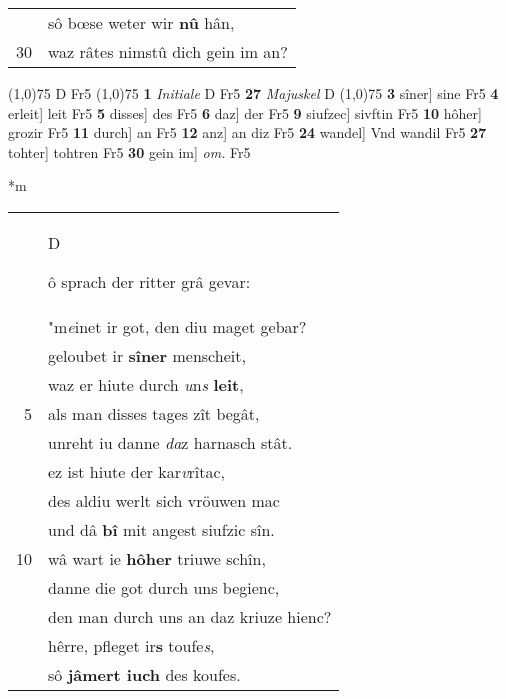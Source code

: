 \documentclass[8pt,a4paper,notitlepage]{article}
\begin{document}
\begin{table}[ht]
\begin{minipage}[t]{0.5\linewidth}
\begin{tabular}{rl}
 & sô bœse weter wir \textbf{nû} hân,\\ 
30 & waz râtes nimstû dich gein im an?\\ 
\end{tabular}
\scriptsize
\line(1,0){75} \newline
D Fr5 \newline
\line(1,0){75} \newline
\textbf{1} \textit{Initiale} D Fr5  \textbf{27} \textit{Majuskel} D  \newline
\line(1,0){75} \newline
\textbf{3} sîner] sine Fr5 \textbf{4} erleit] leit Fr5 \textbf{5} disses] des Fr5 \textbf{6} daz] der Fr5 \textbf{9} siufzec] sivftin Fr5 \textbf{10} hôher] grozir Fr5 \textbf{11} durch] an Fr5 \textbf{12} anz] an diz Fr5 \textbf{24} wandel] Vnd wandil Fr5 \textbf{27} tohter] tohtren Fr5 \textbf{30} gein im] \textit{om.} Fr5 \newline
\end{minipage}
\hspace{0.5cm}
\begin{minipage}[t]{0.5\linewidth}
\small
\begin{center}*m
\end{center}
\begin{tabular}{rl}
 & \begin{large}D\end{large}ô sprach der ritter grâ gevar:\\ 
 & "m\textit{e}inet ir got, den diu maget gebar?\\ 
 & geloubet ir \textbf{sîner} menscheit,\\ 
 & waz er hiute durch \textit{u}n\textit{s} \textbf{leit},\\ 
5 & als man disses tages zît begât,\\ 
 & unreht iu danne \textit{da}z harnasch stât.\\ 
 & ez ist hiute der kar\textit{v}rîtac,\\ 
 & des aldiu werlt sich vröuwen mac\\ 
 & und dâ \textbf{bî} mit angest siufzic sîn.\\ 
10 & wâ wart ie \textbf{hôher} triuwe schîn,\\ 
 & danne die got durch uns begienc,\\ 
 & den man durch uns an daz kriuze hienc?\\ 
 & hêrre, pfleget ir\textbf{s} toufe\textit{s},\\ 
 & sô \textbf{jâmert iuch} des koufes.\\ 

\end{tabular}
\end{minipage}
\end{table}
\end{document}
